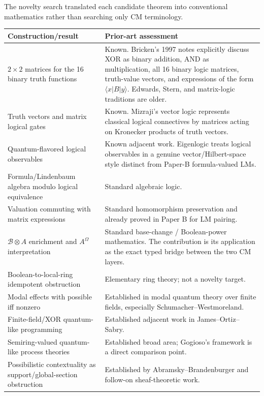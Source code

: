 \documentclass[11pt]{article}
\theoremstyle{definition}
\newcommand{\B}{\mathcal{B}}
\begin{document}
The novelty search translated each candidate theorem into conventional mathematics rather than
searching only CM terminology.

\begin{longtable}{p{}p{}}
\toprule
\textbf{Construction/result} & \textbf{Prior-art assessment} \\
\midrule
\endhead
\(2\times2\) matrices for the 16 binary truth functions & Known. Bricken's 1997 notes explicitly discuss XOR as binary addition, AND as multiplication, all 16 binary logic matrices, truth-value vectors, and expressions of the form \(\langle x\vert B\vert y\rangle\). Edwards, Stern, and matrix-logic traditions are older.\\
\addlinespace
Truth vectors and matrix logical gates & Known. Mizraji's vector logic represents classical logical connectives by matrices acting on Kronecker products of truth vectors.\\
\addlinespace
Quantum-flavored logical observables & Known adjacent work. Eigenlogic treats logical observables in a genuine vector/Hilbert-space style distinct from Paper-B formula-valued LMs.\\
\addlinespace
Formula/Lindenbaum algebra modulo logical equivalence & Standard algebraic logic.\\
\addlinespace
Valuation commuting with matrix expressions & Standard homomorphism preservation and already proved in Paper B for LM pairing.\\
\addlinespace
\(\B\otimes A\) enrichment and \(A^\Omega\) interpretation & Standard base-change / Boolean-power mathematics. The contribution is its application as the exact typed bridge between the two CM layers.\\
\addlinespace
Boolean-to-local-ring idempotent obstruction & Elementary ring theory; not a novelty target.\\
\addlinespace
Modal effects with possible iff nonzero & Established in modal quantum theory over finite fields, especially Schumacher--Westmoreland.\\
\addlinespace
Finite-field/XOR quantum-like programming & Established adjacent work in James--Ortiz--Sabry.\\
\addlinespace
Semiring-valued quantum-like process theories & Established broad area; Gogioso's framework is a direct comparison point.\\
\addlinespace
Possibilistic contextuality as support/global-section obstruction & Established by Abramsky--Brandenburger and follow-on sheaf-theoretic work.\\

\end{longtable}
\end{document}
